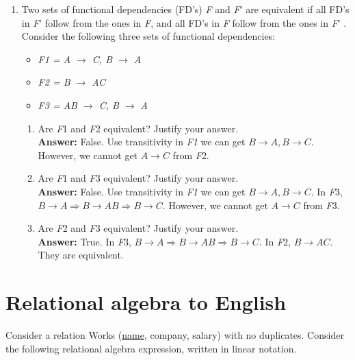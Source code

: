 \documentclass[paper=a4, fontsize=11pt]{scrartcl}
\numberwithin{equation}{section}		%
\numberwithin{figure}{section}			%
\numberwithin{table}{section}				%
\begin{document}
\begin{enumerate}
    \item Two sets of functional dependencies (FD's) \textit{F} and \textit{F}' are equivalent if all FD's in \textit{F}' follow from the ones in \textit{F}, and all FD's in \textit{F} follow from the ones in \textit{F}' . Consider the following three sets of functional dependencies:\\
    
      \begin{itemize}
        \item \textit{F1 = A $\rightarrow$ C, B $\rightarrow$ A}
        \item \textit{F2 = B $\rightarrow$ AC}
        \item \textit{F3 = AB $\rightarrow$ C, B $\rightarrow$ A}
      \end{itemize}
    
    \begin{enumerate}
    \item Are \textit{F}1 and \textit{F}2 equivalent? Justify your answer.\\
    \textbf{Answer:} False. Use transitivity in \textit{F1} we can get $B \rightarrow A, B \rightarrow C$. However, we cannot get $ A \rightarrow C$ from \textit{F}2.
    
    \item Are \textit{F}1 and \textit{F}3 equivalent? Justify your answer.\\
    \textbf{Answer:} False. Use transitivity in \textit{F1} we can get $B \rightarrow A, B \rightarrow C$. In \textit{F}3, $B \rightarrow A \Rightarrow B \rightarrow AB \Rightarrow B \rightarrow C$. However, we cannot get $ A \rightarrow C$ from \textit{F}3.
    
    \item Are \textit{F}2 and \textit{F}3 equivalent? Justify your answer.\\
    \textbf{Answer:} True. In \textit{F}3, $B \rightarrow A \Rightarrow B \rightarrow AB \Rightarrow B \rightarrow C$. In \textit{F}2, $B \rightarrow AC$. They are equivalent.
    
    \end{enumerate}

\end{enumerate}


\section{Relational algebra to English}
Consider a relation Works (\underline{name}, company, salary) with no duplicates. Consider the following
relational algebra expression, written in linear notation.
\end{document}

